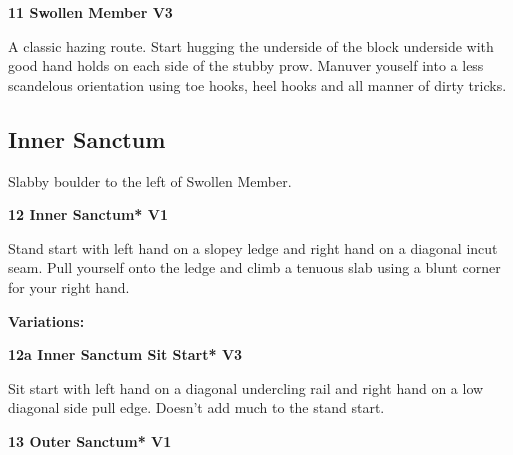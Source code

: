 \begin{multicols}{2}
					\begin{minipage}{\linewidth}	
					\label{rt:Swollen Member}
\colorbox{green!20}{
\textbf{
11 Swollen Member V3    
}
}

					\begin{adjustwidth}{0.5cm}{}				
					A classic hazing route. Start hugging the underside of the block underside with good hand holds on each side of the stubby prow. Manuver youself into a less scandelous orientation using toe hooks, heel hooks and  all manner of dirty tricks.
					\end{adjustwidth}
					\end{minipage}
			\subsection*{Inner Sanctum}\label{bf:Inner Sanctum}
			\begin{minipage}{\columnwidth}
			Slabby boulder to the left of Swollen Member.
			\end{minipage}
			

					\begin{minipage}{\linewidth}	
					\label{rt:Inner Sanctum}
\colorbox{green!20}{
\textbf{
12 Inner Sanctum* V1    \warn 
}
}

					\begin{adjustwidth}{0.5cm}{}				
					Stand start with left hand on a slopey ledge and right hand on a diagonal incut seam. Pull yourself onto the ledge and climb a tenuous slab using a blunt corner for your right hand.
					\end{adjustwidth}
					\end{minipage}
						\begin{adjustwidth}{0.5cm}{}				
						\textbf{Variations:} \newline
							\begin{minipage}{\linewidth}	
							\label{vr:Inner Sanctum Sit Start}
\colorbox{green!20}{
\textbf{
12a Inner Sanctum Sit Start* V3   
}
}

							\begin{adjustwidth}{0.5cm}{}				
							Sit start with left hand on a diagonal undercling rail and right hand on a low diagonal side pull edge. Doesn't add much to the stand start.
							\end{adjustwidth}
							\end{minipage}
						\end{adjustwidth}
					\begin{minipage}{\linewidth}	
					\label{rt:Outer Sanctum}
\colorbox{green!20}{
\textbf{
13 Outer Sanctum* V1   
}
}


\end{minipage}
\end{multicols}
